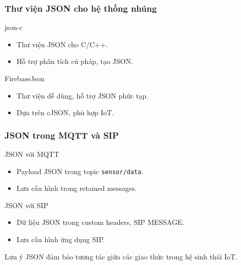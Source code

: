 \begin{frame}
\frametitle{Thư viện JSON cho hệ thống nhúng}

\begin{block}{json-c}
\begin{itemize}
\item Thư viện JSON cho C/C++.
\item Hỗ trợ phân tích cú pháp, tạo JSON.
\end{itemize}
\end{block}

\begin{block}{FirebaseJson}
\begin{itemize}
\item Thư viện dễ dùng, hỗ trợ JSON phức tạp.
\item Dựa trên cJSON, phù hợp IoT.
\end{itemize}
\end{block}
\end{frame}



\begin{frame}
\frametitle{JSON trong MQTT và SIP}
\begin{block}{JSON với MQTT}
\begin{itemize}
\item Payload JSON trong topic \texttt{sensor/data}.
\item Lưu cấu hình trong retained messages.
\end{itemize}
\end{block}

\begin{block}{JSON với SIP}
\begin{itemize}
\item Dữ liệu JSON trong custom headers, SIP MESSAGE.
\item Lưu cấu hình ứng dụng SIP.
\end{itemize}
\end{block}

\begin{alertblock}{Lưu ý}
JSON đảm bảo tương tác giữa các giao thức trong hệ sinh thái IoT.
\end{alertblock}
\end{frame}


